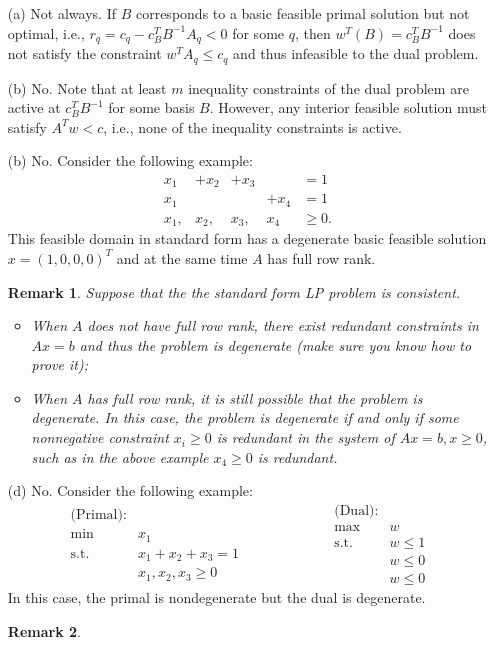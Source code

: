 \documentclass[12pt]{article}
\newtheorem{remark}{Remark}
\begin{document}
\begin{itemize}
	\item[(a)] Not always. If $B$ corresponds to a basic feasible primal solution but not optimal, i.e., $r_q=c_q-c^T_BB^{-1}A_q<0$ for some $q$, then $w^T(B)=c^T_BB^{-1}$ does not satisfy the constraint $w^TA_q\leq c_q$ and thus infeasible to the dual problem.
	\item[(b)] No. Note that at least $m$ inequality constraints of the dual problem are active at $c^T_BB^{-1}$ for some basis $B$. However, any interior feasible solution must satisfy $A^Tw<c$, i.e., none of the inequality constraints is active. 
	\item[(b)] No. Consider the following example:
\begin{equation*}
\begin{array}{lllll}
x_1 &+ x_2 &+x_3 &  & = 1 \\
x_1 & & & +x_4&=1 \\
x_1, & x_2, & x_3, & x_4 & \geq 0.
\end{array}
\end{equation*}
This feasible domain in standard form has a degenerate basic feasible solution $x=(1, 0, 0, 0)^T$ and at the same time $A$ has full row rank.
\begin{remark}
	Suppose that the the standard form LP problem is consistent. 
	\begin{itemize}
		\item When $A$ does not have full row rank, there exist redundant constraints in $Ax=b$ and thus the problem is degenerate (make sure you know how to prove it); 
		\item When $A$ has full row rank, it is still possible that the problem is degenerate. In this case, the problem is degenerate if and only if some nonnegative constraint $x_i\geq 0$ is redundant in the system of $Ax=b, x\geq 0$, such as in the above example $x_4\geq0$ is redundant.
	\end{itemize}
\end{remark}

\item[(d)] No. Consider the following example:
\begin{equation*}
\begin{array}{rl}
\text{(Primal):} & \\
\min & x_1 \\\text{s.t.} & x_1 + x_2 +x_3=1 \\
& x_1, x_2, x_3 \geq 0
\end{array} \qquad \qquad \qquad
\begin{array}{rl}
\text{(Dual):} & \\
\max & w \\
\text{s.t.} & w\leq 1 \\ & w\leq0 \\ & w\leq 0
\end{array}
\end{equation*}
In this case, the primal is nondegenerate but the dual is degenerate. 
\begin{remark}
	

\end{remark}
\end{itemize}
\end{document}
